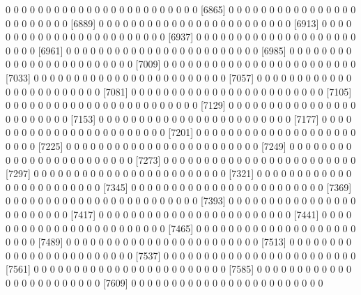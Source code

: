 \documentclass[11pt]{article}
\begin{document}
\begin{Schunk}
\begin{Soutput}
 [6841]  0  0  0  0  0  0  0  0  0  0  0  0  0  0  0  0  0  0  0  0  0  0  0  0
 [6865]  0  0  0  0  0  0  0  0  0  0  0  0  0  0  0  0  0  0  0  0  0  0  0  0
 [6889]  0  0  0  0  0  0  0  0  0  0  0  0  0  0  0  0  0  0  0  0  0  0  0  0
 [6913]  0  0  0  0  0  0  0  0  0  0  0  0  0  0  0  0  0  0  0  0  0  0  0  0
 [6937]  0  0  0  0  0  0  0  0  0  0  0  0  0  0  0  0  0  0  0  0  0  0  0  0
 [6961]  0  0  0  0  0  0  0  0  0  0  0  0  0  0  0  0  0  0  0  0  0  0  0  0
 [6985]  0  0  0  0  0  0  0  0  0  0  0  0  0  0  0  0  0  0  0  0  0  0  0  0
 [7009]  0  0  0  0  0  0  0  0  0  0  0  0  0  0  0  0  0  0  0  0  0  0  0  0
 [7033]  0  0  0  0  0  0  0  0  0  0  0  0  0  0  0  0  0  0  0  0  0  0  0  0
 [7057]  0  0  0  0  0  0  0  0  0  0  0  0  0  0  0  0  0  0  0  0  0  0  0  0
 [7081]  0  0  0  0  0  0  0  0  0  0  0  0  0  0  0  0  0  0  0  0  0  0  0  0
 [7105]  0  0  0  0  0  0  0  0  0  0  0  0  0  0  0  0  0  0  0  0  0  0  0  0
 [7129]  0  0  0  0  0  0  0  0  0  0  0  0  0  0  0  0  0  0  0  0  0  0  0  0
 [7153]  0  0  0  0  0  0  0  0  0  0  0  0  0  0  0  0  0  0  0  0  0  0  0  0
 [7177]  0  0  0  0  0  0  0  0  0  0  0  0  0  0  0  0  0  0  0  0  0  0  0  0
 [7201]  0  0  0  0  0  0  0  0  0  0  0  0  0  0  0  0  0  0  0  0  0  0  0  0
 [7225]  0  0  0  0  0  0  0  0  0  0  0  0  0  0  0  0  0  0  0  0  0  0  0  0
 [7249]  0  0  0  0  0  0  0  0  0  0  0  0  0  0  0  0  0  0  0  0  0  0  0  0
 [7273]  0  0  0  0  0  0  0  0  0  0  0  0  0  0  0  0  0  0  0  0  0  0  0  0
 [7297]  0  0  0  0  0  0  0  0  0  0  0  0  0  0  0  0  0  0  0  0  0  0  0  0
 [7321]  0  0  0  0  0  0  0  0  0  0  0  0  0  0  0  0  0  0  0  0  0  0  0  0
 [7345]  0  0  0  0  0  0  0  0  0  0  0  0  0  0  0  0  0  0  0  0  0  0  0  0
 [7369]  0  0  0  0  0  0  0  0  0  0  0  0  0  0  0  0  0  0  0  0  0  0  0  0
 [7393]  0  0  0  0  0  0  0  0  0  0  0  0  0  0  0  0  0  0  0  0  0  0  0  0
 [7417]  0  0  0  0  0  0  0  0  0  0  0  0  0  0  0  0  0  0  0  0  0  0  0  0
 [7441]  0  0  0  0  0  0  0  0  0  0  0  0  0  0  0  0  0  0  0  0  0  0  0  0
 [7465]  0  0  0  0  0  0  0  0  0  0  0  0  0  0  0  0  0  0  0  0  0  0  0  0
 [7489]  0  0  0  0  0  0  0  0  0  0  0  0  0  0  0  0  0  0  0  0  0  0  0  0
 [7513]  0  0  0  0  0  0  0  0  0  0  0  0  0  0  0  0  0  0  0  0  0  0  0  0
 [7537]  0  0  0  0  0  0  0  0  0  0  0  0  0  0  0  0  0  0  0  0  0  0  0  0
 [7561]  0  0  0  0  0  0  0  0  0  0  0  0  0  0  0  0  0  0  0  0  0  0  0  0
 [7585]  0  0  0  0  0  0  0  0  0  0  0  0  0  0  0  0  0  0  0  0  0  0  0  0
 [7609]  0  0  0  0  0  0  0  0  0  0  0  0  0  0  0  0  0  0  0  0  0  0  0  0

\end{Soutput}
\end{Schunk}
\end{document}
